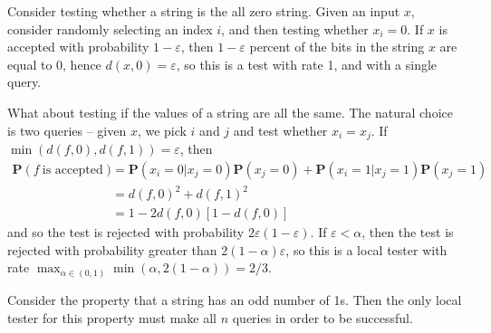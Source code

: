 \begin{example}
    Consider testing whether a string is the all zero string. Given an input $x$, consider randomly selecting an index $i$, and then testing whether $x_i = 0$. If $x$ is accepted with probability $1 - \varepsilon$, then $1 - \varepsilon$ percent of the bits in the string $x$ are equal to $0$, hence $d(x,0) = \varepsilon$, so this is a test with rate 1, and with a single query.
\end{example}

\begin{example}
    What about testing if the values of a string are all the same. The natural choice is two queries -- given $x$, we pick $i$ and $j$ and test whether $x_i = x_j$. If $\min(d(f,0), d(f,1)) = \varepsilon$, then
    \begin{align*}
        \mathbf{P}(f\ \text{is accepted}) &= \mathbf{P}(x_i = 0 | x_j = 0) \mathbf{P}(x_j = 0) + \mathbf{P}(x_i = 1 | x_j = 1) \mathbf{P}(x_j = 1)\\
        &= d(f,0)^2 + d(f,1)^2\\
        &= 1 - 2d(f,0)[1 - d(f,0)]
    \end{align*}
    and so the test is rejected with probability $2\varepsilon(1 - \varepsilon)$. If $\varepsilon < \alpha$, then the test is rejected with probability greater than $2(1 - \alpha) \varepsilon$, so this is a local tester with rate $\max_{\alpha \in (0,1)} \min(\alpha, 2(1 - \alpha)) = 2/3$.
\end{example}

\begin{example}
    Consider the property that a string has an odd number of 1s. Then the only local tester for this property must make all $n$ queries in order to be successful.
\end{example}

